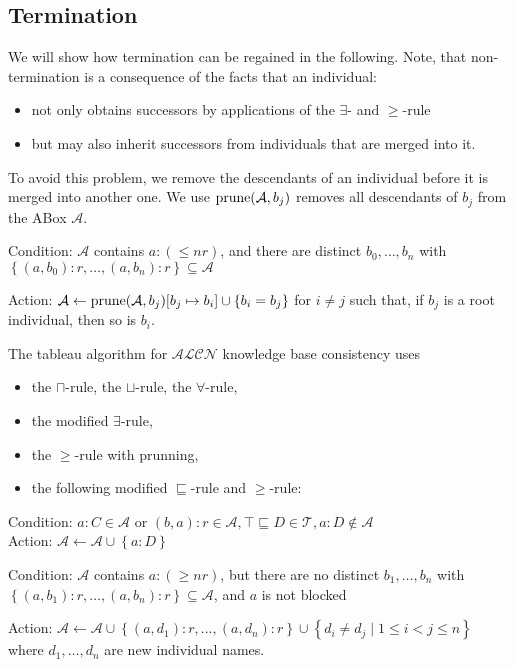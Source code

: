 \subsection*{Termination}
We will show how termination can be regained in the following.
Note, that non-termination is a consequence of the facts that an individual:
\begin{itemize}
	\item not only obtains successors by applications of the $\exists$- and $ \geq$-rule
	\item but may also inherit successors from individuals that are merged into it.
\end{itemize}

To avoid this problem, we remove the descendants of an individual before it is merged into another one.
We use $\operatorname{\text{prune}}(\mathcal{A},b_j)$ removes all descendants of $b_j$ from the ABox $\mathcal{A}$.
\begin{mdframed}[frametitle= The $ \leq$-rule with prunning]
	Condition: $\mathcal{A}$ contains $a:( \leq nr)$, and there are distinct
	$b_0, \ldots, b_n$ with $\left\{ (a,b_0):r, \ldots, (a,b_n):r \right\} \subseteq \mathcal{A}$

	Action: $\mathcal{A} \leftarrow \operatorname{\text{prune}}(\mathcal{A}, b_j)[b_j \mapsto b_i] \cup \left\{ b_i = b_j \right\}$
	for $i \neq j$ such that, if $b_j$ is a root individual, then so is $b_i$.
\end{mdframed}

The tableau algorithm for $\mathcal{ALCN}$ knowledge base consistency uses
\begin{itemize}
	\item the $\sqcap$-rule, the $\sqcup$-rule, the $\forall$-rule,
	\item the modified $\exists$-rule,
	\item the $ \geq$-rule with prunning,
	\item the following modified $\sqsubseteq$-rule and $ \geq$-rule:
\end{itemize}
\begin{mdframed}[frametitle= The modified $\sqsubseteq$-rule, nobreak = true]
	Condition: $a : C \in \mathcal{A}$ or $ (b,a):r \in \mathcal{A}, \top \sqsubseteq D \in \mathcal{T}, a : D \notin \mathcal{A}$\\
	Action: $\mathcal{A} \leftarrow \mathcal{A} \cup \left\{ a: D \right\}$
\end{mdframed}
\begin{mdframed}[frametitle= The modified $ \geq$-rule, nobreak = true]
	Condition: $\mathcal{A}$ contains $a:( \geq nr)$, but there are no distinct
	$b_1, \ldots, b_n$ with $\left\{ (a,b_1):r, \ldots, (a,b_n):r \right\} \subseteq \mathcal{A}$,
	and $a$ is not blocked

	Action: $\mathcal{A} \leftarrow \mathcal{A} \cup \left\{ (a,d_1):r, \ldots, (a,d_n):r \right\} \cup \left\{ d_i \neq d_j \mid 1 \leq i < j \leq n \right\}$
	where $d_1, \ldots, d_n$ are new individual names.
\end{mdframed}


